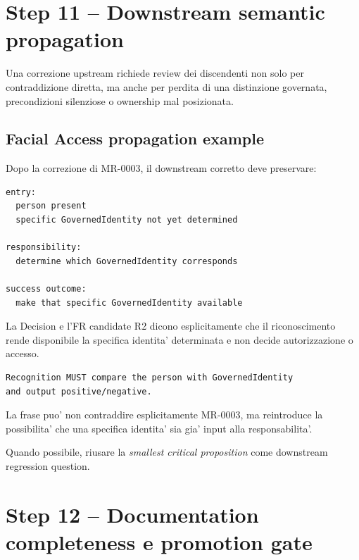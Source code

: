 \documentclass[11pt,a4paper]{article}
\begin{document}
\section{Step 11 -- Downstream semantic propagation}

\begin{statusworking}
Una correzione upstream richiede review dei discendenti non solo per contraddizione diretta, ma anche per perdita di una distinzione governata, precondizioni silenziose o ownership mal posizionata.
\end{statusworking}

\subsection{Facial Access propagation example}

Dopo la correzione di MR-0003, il downstream corretto deve preservare:

\begin{lstlisting}
entry:
  person present
  specific GovernedIdentity not yet determined

responsibility:
  determine which GovernedIdentity corresponds

success outcome:
  make that specific GovernedIdentity available
\end{lstlisting}

\begin{goodbox}
La Decision e l'FR candidate R2 dicono esplicitamente che il riconoscimento rende disponibile la specifica identita' determinata e non decide autorizzazione o accesso.
\end{goodbox}

\begin{badbox}
\begin{lstlisting}
Recognition MUST compare the person with GovernedIdentity
and output positive/negative.
\end{lstlisting}
La frase puo' non contraddire esplicitamente MR-0003, ma reintroduce la possibilita' che una specifica identita' sia gia' input alla responsabilita'.
\end{badbox}

Quando possibile, riusare la \emph{smallest critical proposition} come downstream regression question.

\section{Step 12 -- Documentation completeness e promotion gate}
\end{document}
